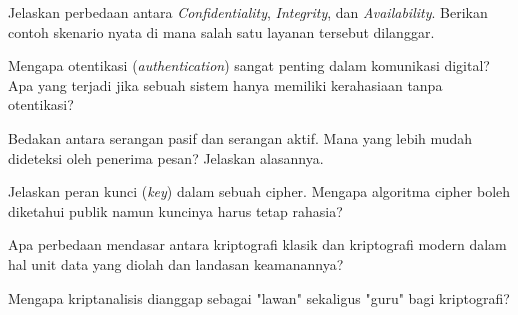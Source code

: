 \documentclass[main.tex]{subfiles}
\begin{document}

\begin{latihan}
  \item Jelaskan perbedaan antara \textit{Confidentiality}, \textit{Integrity}, dan \textit{Availability}. Berikan contoh skenario nyata di mana salah satu layanan tersebut dilanggar.
  \item Mengapa otentikasi (\textit{authentication}) sangat penting dalam komunikasi digital? Apa yang terjadi jika sebuah sistem hanya memiliki kerahasiaan tanpa otentikasi?
  \item Bedakan antara serangan pasif dan serangan aktif. Mana yang lebih mudah dideteksi oleh penerima pesan? Jelaskan alasannya.
  \item Jelaskan peran kunci (\textit{key}) dalam sebuah cipher. Mengapa algoritma cipher boleh diketahui publik namun kuncinya harus tetap rahasia?
  \item Apa perbedaan mendasar antara kriptografi klasik dan kriptografi modern dalam hal unit data yang diolah dan landasan keamanannya?
  \item Mengapa kriptanalisis dianggap sebagai "lawan" sekaligus "guru" bagi kriptografi?
\end{latihan}

\end{document}
